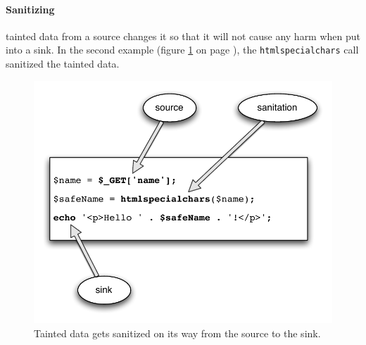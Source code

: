 \paragraph{Sanitizing} tainted data from a source changes it so that it will not cause any harm when put into a sink. In the second example (figure \ref{fig:taint-and-clean} on page \pageref{fig:taint-and-clean}), the \texttt{htmlspecialchars} call sanitized the tainted data.

\begin{figure}[!h]
 \includegraphics[scale=0.8]{images/taint-and-clean}
 \caption{Tainted data gets sanitized on its way from the source to the sink.}
 \label{fig:taint-and-clean}
\end{figure}

